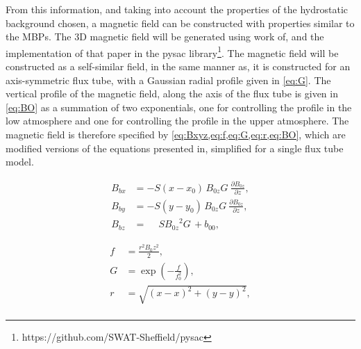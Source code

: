 \documentclass[a4paper,12pt,fourier,authoryear,custommargin]{Classes/PhDThesisPSnPDF}
\providecommand{\DIFaddtex}[1]{{\protect\color{blue}\uwave{#1}}} %
\providecommand{\DIFaddbegin}{} %
\providecommand{\DIFaddend}{} %
\providecommand{\DIFadd}[1]{\texorpdfstring{\DIFaddtex{#1}}{#1}} %
\begin{document}
\newcommand{\BO}{{B_{0z}}}
\newcommand{\GO}{{G}}
\newcommand{\bc}{{b_{00}}}
\newcommand{\bF}{{b_{01}}}
\newcommand{\za}{{z_{1}}}
\newcommand{\bb}{{b_{02}}}
\newcommand{\zb}{{z_{2}}}

From this information, and taking into account the properties of the hydrostatic background chosen, a magnetic field can be constructed with properties similar to the MBPs.
The 3D magnetic field will be generated using work of\DIFaddbegin \DIFadd{~}\DIFaddend \cite{gent2013, gent2014}, and the implementation of that paper in the pysac library\footnote{https://github.com/SWAT-Sheffield/pysac}.
The magnetic field will be constructed as a self-similar field, in the same manner as\DIFaddbegin \DIFadd{~}\DIFaddend \cite{schluter1958}, it is constructed for an axis-symmetric flux tube, with a Gaussian radial profile given in \cref{eq:G}.
The vertical profile of the magnetic field, along the axis of the flux tube is given in \cref{eq:BO} as a summation of two exponentials, one for controlling the profile in the low atmosphere and one for controlling the profile in the upper atmosphere.
The magnetic field is therefore specified by \cref{eq:Bxyz,eq:f,eq:G,eq:r,eq:BO}, which are modified versions of the equations presented in\DIFaddbegin \DIFadd{~}\DIFaddend \cite{gent2014}, simplified for a single flux tube model.

\begin{equation}\label{eq:Bxyz}
\begin{aligned}
B_{bx} &= -S(x-x_0) {\, \BO\GO \:} \frac{\partial \BO}{\partial z},
\\
B_{by} &= -S(y-y_0) {\, \BO\GO \:} \frac{\partial \BO}{\partial z},
\\
B_{bz} &= \phantom{-}S{\BO^2\GO  \,} + \bc,
\end{aligned}
\end{equation}


\begin{align}
f &= \frac{r^2 B_0z^2}{2},  \label{eq:f}
\\
G &= \exp\left(-\frac{f}{f_0^2}\right),  \label{eq:G}
\\
r \,   &= \sqrt{(x-x )^2+(y-y )^2},\\  \label{eq:r}
\end{align}
\end{document}
